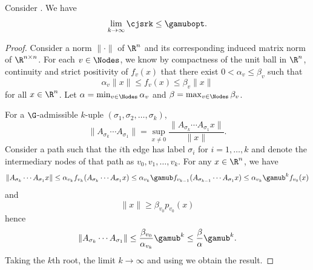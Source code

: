 \begin{theorem}
  \label{theo:stabcert}
  Consider .
  We have
  \[ \lim_{k \to \infty} \cjsrk \leq \gamubopt. \]
  \begin{proof}
    Consider a norm $\|\cdot\|$ of $\R^n$ and its corresponding induced matrix norm of $\R^{n \times n}$.
    For each $v \in \Nodes$, we know by compactness of the unit ball in $\R^n$, continuity and strict positivity of $f_v(x)$ that there exist $0 < \alpha_v \leq \beta_v$ such that
    \[ \alpha_v \|x\| \leq f_v(x) \leq \beta_v\|x\| \]
    for all $x \in \R^n$.
    Let $\alpha = \min_{v \in \Nodes} \alpha_v$ and $\beta = \max_{v \in \Nodes} \beta_v$.

    For a $\G$-admissible $k$-uple $(\sigma_1, \sigma_2, \ldots, \sigma_k)$,
    \[ \|A_{\sigma_k} \cdots A_{\sigma_1}\| = \sup_{x \neq 0} \frac{\|A_{\sigma_k} \cdots A_{\sigma_1}x\|}{\|x\|}. \]
    Consider a path such that the $i$th edge has label $\sigma_i$ for $i = 1, \ldots, k$
    and denote the intermediary nodes of that path as $v_0, v_1, \ldots, v_k$.
    For any $x \in \R^n$, we have
    \begin{align*}
      \|A_{\sigma_k} \cdots A_{\sigma_1}x\| %
                                            \leq \alpha_{v_k} f_{v_k}(A_{\sigma_k} \cdots A_{\sigma_1} x)%
                                            \leq \alpha_{v_k} \gamub f_{v_{k-1}}(A_{\sigma_{k-1}} \cdots A_{\sigma_1} x)%
                                            \leq \alpha_{v_k} \gamub^{k} f_{v_0}(x)
    \end{align*}
    and
    \[ \|x\| \geq \beta_{v_0} p_{v_0}(x) \]
    hence
    \[ \|A_{\sigma_k} \cdots A_{\sigma_1}\| \leq \frac{\beta_{v_0}}{\alpha_{v_k}} \gamub^k \leq \frac{\beta}{\alpha} \gamub^k. \]
    Taking the $k$th root, the limit $k \to \infty$ and using  we obtain the result.
  \end{proof}
\end{theorem}
